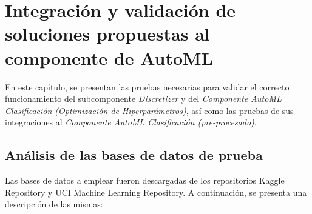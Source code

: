 \chapter{Integración y validación de soluciones propuestas al componente de AutoML}\label{chap:3}
En este capítulo, se presentan las pruebas necesarias para validar el correcto funcionamiento del subcomponente \textit{Discretizer} y del \textit{Componente AutoML Clasificación (Optimización de Hiperparámetros)}, así como las pruebas de sus integraciones al \textit{Componente AutoML Clasificación (pre-procesado)}.

\section{Análisis de las bases de datos de prueba}
Las bases de datos a emplear fueron descargadas de los repositorios Kaggle Repository y UCI Machine Learning Repository. A continuación, se presenta una descripción de las mismas:
